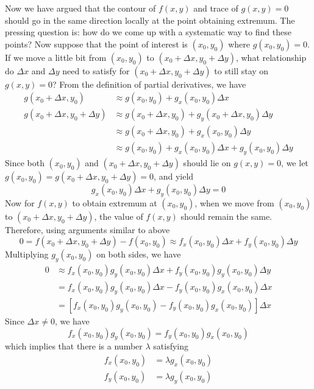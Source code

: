 Now we have argued that the contour of $f(x,y)$ and trace of $g(x,y) = 0$ should go in the same direction locally at the point obtaining extremum.  The pressing question is: how do we come up with a systematic way to find these points?  Now suppose that the point of interest is $(x_0, y_0)$ where $g(x_0, y_0)=0$.  If we move a little bit from $(x_0, y_0)$ to $(x_0 + \Delta x, y_0 + \Delta y)$, what relationship do $\Delta x$ and $\Delta y$ need to satisfy for $(x_0 + \Delta x, y_0 + \Delta y)$ to still stay on $g(x,y) = 0$?  From the definition of partial derivatives, we have
\begin{align*}
    g(x_0 + \Delta x, y_0) &\approx g(x_0,y_0) + g_x(x_0, y_0) \Delta x\\
    g(x_0 + \Delta x, y_0 + \Delta y) &\approx g(x_0 + \Delta x,y_0) + g_y(x_0+\Delta x, y_0) \Delta y\\
    &\approx g(x_0 + \Delta x,y_0) + g_x(x_0, y_0) \Delta y\\
    &\approx g(x_0,y_0) + g_x(x_0, y_0) \Delta x + g_y(x_0, y_0) \Delta y
\end{align*}
Since both $(x_0,y_0)$ and $(x_0 + \Delta x, y_0 + \Delta y)$ should lie on $g(x,y)=0$, we let $g(x_0, y_0) = g(x_0 + \Delta x, y_0 + \Delta y) = 0$, and yield
\[g_x(x_0, y_0) \Delta x + g_y(x_0, y_0) \Delta y = 0\]
Now for $f(x,y)$ to obtain extremum at $(x_0, y_0)$, when we move from $(x_0, y_0)$ to $(x_0 + \Delta x, y_0 + \Delta y)$, the value of $f(x,y)$ should remain the same.  Therefore, using arguments similar to above
\[0 = f(x_0 + \Delta x, y_0 + \Delta y) - f(x_0,y_0) \approx f_x(x_0, y_0) \Delta x + f_y(x_0, y_0) \Delta y\]
Multiplying $g_y(x_0, y_0)$ on both sides, we have
\begin{align*}
    0 &\approx f_x(x_0, y_0)g_y(x_0, y_0) \Delta x + f_y(x_0, y_0)g_y(x_0, y_0) \Delta y\\
    &= f_x(x_0, y_0)g_y(x_0, y_0) \Delta x - f_y(x_0, y_0)g_x(x_0, y_0)\Delta x\\
    &= [f_x(x_0, y_0)g_y(x_0, y_0) - f_y(x_0, y_0)g_x(x_0, y_0)]\Delta x
\end{align*}
Since $\Delta x \ne 0$, we have
\[f_x(x_0,y_0)g_y(x_0, y_0) = f_y(x_0, y_0)g_x(x_0, y_0)\]
which implies that there is a number $\lambda$ satisfying
\begin{align*}
    f_x(x_0,y_0) &= \lambda g_x(x_0,y_0)\\
    f_y(x_0,y_0) &= \lambda g_y(x_0,y_0)
\end{align*}
